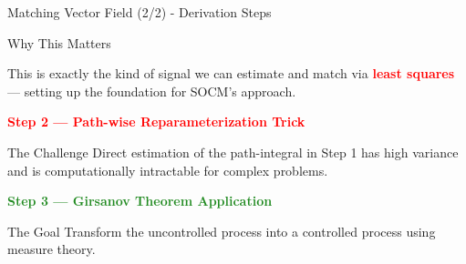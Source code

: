 \documentclass[aspectratio=169,xcolor=dvipsnames]{beamer}
\begin{document}
\begin{frame}[allowframebreaks]{Matching Vector Field (2/2) - Derivation Steps}
\begin{block}{Why This Matters}
        \vspace{0.3cm}
        
        This is exactly the kind of signal we can estimate and match via \textcolor{red}{\textbf{least squares}} — setting up the foundation for SOCM's approach.
    \end{block}
    
    \framebreak
    
    \begin{center}
        \Large\textcolor{red}{\textbf{Step 2 — Path-wise Reparameterization Trick}}
    \end{center}
    
    \vspace{0.3cm}
    
    \begin{block}{The Challenge}
        Direct estimation of the path-integral in Step 1 has high variance and is computationally intractable for complex problems.
    \end{block}
    
    
    \framebreak
    
    \begin{center}
        \Large\textcolor{ForestGreen}{\textbf{Step 3 — Girsanov Theorem Application}}
    \end{center}
    
    \vspace{0.3cm}
    
    \begin{block}{The Goal}
        Transform the uncontrolled process into a controlled process using measure theory.
    \end{block}
    

\end{frame}
\end{document}
